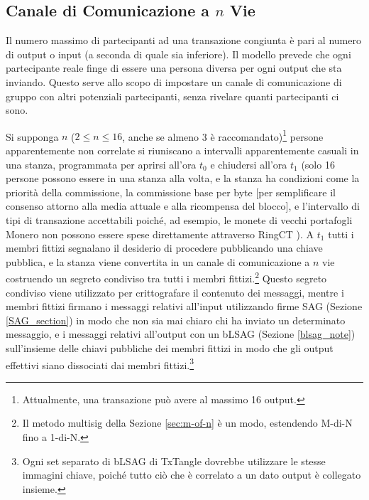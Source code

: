 \subsection{Canale di Comunicazione a $n$ Vie }
\label{subsec:n-way-channel}

Il numero massimo di partecipanti ad una transazione congiunta è pari al numero di output o input (a seconda di quale sia inferiore). Il modello prevede che ogni partecipante reale finge di essere una persona diversa per ogni output che sta inviando. Questo serve allo scopo di impostare un canale di comunicazione di gruppo con altri potenziali partecipanti, senza rivelare quanti partecipanti ci sono.

Si supponga $n$ ($2 \leq n \leq 16$, anche se almeno 3 è raccomandato)\footnote{Attualmente, una transazione può avere al massimo 16 output.} persone apparentemente non correlate si riuniscano a intervalli apparentemente casuali in una stanza, programmata per aprirsi all'ora $t_0$ e chiudersi all'ora $t_1$ (solo 16 persone possono essere in una stanza alla volta, e la stanza ha condizioni come la priorità della commissione, la commissione base per byte [per semplificare il consenso attorno alla media attuale e alla ricompensa del blocco], e l'intervallo di tipi di transazione accettabili poiché, ad esempio, le monete di vecchi portafogli Monero non possono essere spese direttamente attraverso RingCT \cite{pre-ringct-outputs-like-coinbase-research-issue-59}). A $t_1$ tutti i membri fittizi segnalano il desiderio di procedere pubblicando una chiave pubblica, e la stanza viene convertita in un canale di comunicazione a $n$ vie costruendo un segreto condiviso tra tutti i membri fittizi.\footnote{Il metodo multisig della Sezione \ref{sec:m-of-n} è un modo, estendendo M-di-N fino a 1-di-N.} Questo segreto condiviso viene utilizzato per crittografare il contenuto dei messaggi, mentre i membri fittizi firmano i messaggi relativi all'input utilizzando firme SAG (Sezione \ref{SAG_section}) in modo che non sia mai chiaro chi ha inviato un determinato messaggio, e i messaggi relativi all'output con un bLSAG (Sezione \ref{blsag_note}) sull'insieme delle chiavi pubbliche dei membri fittizi in modo che gli output effettivi siano dissociati dai membri fittizi.\footnote{Ogni set separato di bLSAG di TxTangle dovrebbe utilizzare le stesse immagini chiave, poiché tutto ciò che è correlato a un dato output è collegato insieme.}%


